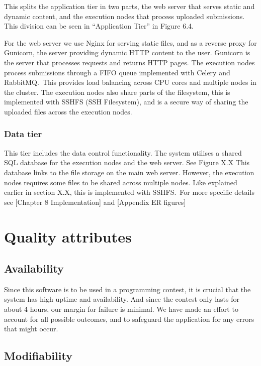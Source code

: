This splits the application tier in two parts, the web server that
serves static and dynamic content, and the execution nodes that process
uploaded submissions. This division can be seen in
``Application Tier'' in Figure 6.4.


For the web server we use Nginx for serving static files, and as a
reverse proxy for Gunicorn, the server providing dynamic HTTP content
to the user. Gunicorn is the server that processes requests and returns
HTTP pages. The execution nodes process submissions through a FIFO
queue implemented with Celery and RabbitMQ.\ This provides load
balancing across CPU cores and multiple nodes in the cluster. The
execution nodes also share parts of the filesystem, this is implemented
with SSHFS (SSH Filesystem), and is a secure way of sharing the
uploaded files across the execution nodes. 


\subsubsection{Data tier}

This tier includes the data control functionality. The system utilises a
shared SQL database for the execution nodes and the web server. See
Figure X.X This database links to the file storage on the main web
server. However, the execution nodes requires some files to be shared
across multiple nodes. Like explained earlier in section X.X, this is
implemented with SSHFS.\ For more specific details see [Chapter 8
Implementation] and [Appendix ER figures]


\section{Quality attributes}

\subsection{Availability}

Since this software is to be used in a programming contest, it is
crucial that the system has high uptime and availability. And since the
contest only lasts for about 4 hours, our margin for failure is
minimal. We have made an effort to account for all possible outcomes,
and to safeguard the application for any errors that might occur. 

\subsection{Modifiability}

